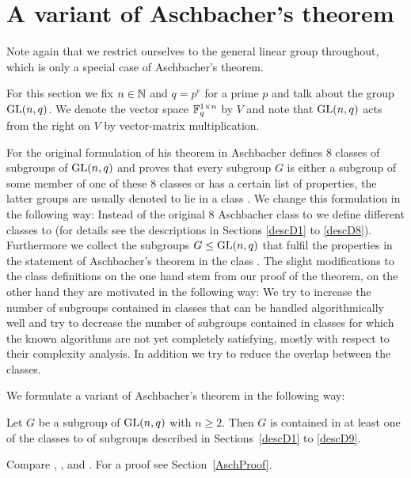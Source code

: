 \section{A variant of Aschbacher's theorem}
\label{sect:aschbacher}

Note again that we restrict ourselves to the general linear group
throughout, which is only a special case of Aschbacher's theorem.

\begin{Not}
For this section we fix $n \in \mathbb{N}$ and $q=p^e$ for a prime $p$ and
talk about the group $\GL(n,q)$. We denote the vector space $\mathbb{F}_q^{1
\times n}$ by $V$ and note that $\GL(n,q)$ acts from the right on $V$ by
vector-matrix multiplication.
\end{Not}

For the original formulation of his theorem in \cite{aschbacher} Aschbacher 
defines $8$ classes
of subgroups of $\GL(n,q)$ and proves that every subgroup $G$ is either
a subgroup of some member of one of these $8$ classes or has a certain
list of properties, the latter groups are usually denoted to lie in
a class . We change this formulation in the following
way: Instead of the original 8 Aschbacher class  to 
we define different classes  to 
(for details see the descriptions in Sections \ref{descD1} to
\ref{descD8}).
Furthermore we collect
the subgroups $G \le \GL(n,q)$ that fulfil the properties in the statement of 
Aschbacher's theorem in the class . The slight modifications 
to the class definitions on the one hand stem from our proof of the
theorem, on the other hand they are motivated in the following way: We try
to increase the number of subgroups contained in classes that can be
handled algorithmically well and try to decrease the number of subgroups
contained in classes for which the known algorithms are not yet completely
satisfying, mostly with respect to their complexity analysis.
In addition we try to reduce the overlap between the classes.

We formulate a variant of Aschbacher's theorem in the following way:

\begin{Theo}
\label{Asch}
Let $G$ be a subgroup of\/ $\GL(n,q)$ with $n \ge 2$.
Then $G$ is contained in at least one of the
classes  to  of subgroups described in Sections~\ref{descD1}
to \ref{descD9}.
\end{Theo}
\proofbeg Compare \cite[Appendix 2, Theorem 1]{RobPhd}, \cite{aschbacher}, 
\cite{kleilieb} and 
\cite[Theorem~1]{smashprim}. For a proof see Section~\ref{AschProof}.
\proofend

